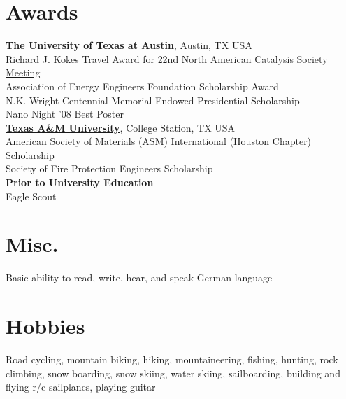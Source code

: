 \documentclass[centered]{res}
\begin{document}
\begin{resume}
\section{Awards}
% 
\href{http://www.utexas.edu/}{\textbf{The University of Texas at
    Austin}}, Austin, TX USA \\
Richard J. Kokes Travel Award for
\href{http://www.22nam.org/}{22nd North American Catalysis Society
  Meeting} \\
Association of Energy Engineers Foundation Scholarship Award \\
N.K. Wright Centennial Memorial Endowed Presidential Scholarship \\
Nano Night '08 Best Poster \vspace{5pt} \\
%
\href{http://www.tamu.edu/}{\textbf{Texas A\&M University}}, College
Station, TX USA \\
American Society of Materials (ASM) International (Houston Chapter)
Scholarship \\
Society of Fire Protection Engineers Scholarship \vspace{5pt} \\
%
\textbf{Prior to University Education} \\
Eagle Scout

\section{Misc.}
%
Basic ability to read, write, hear, and speak German language

\section{Hobbies}
%
Road cycling, mountain biking, hiking, mountaineering, fishing,
hunting, rock climbing, snow boarding, snow skiing, water skiing,
sailboarding, building and flying r/c sailplanes, playing guitar

\end{resume}
\end{document}
